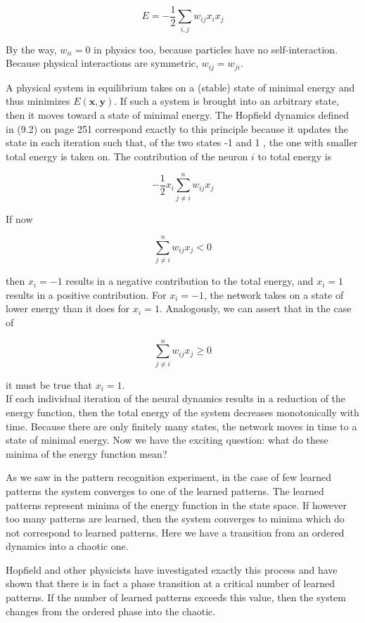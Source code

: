 \documentclass[10pt]{article}
\begin{document}
$$
E=-\frac{1}{2} \sum_{i, j} w_{i j} x_{i} x_{j}
$$

By the way, $w_{i i}=0$ in physics too, because particles have no self-interaction. Because physical interactions are symmetric, $w_{i j}=w_{j i}$.

A physical system in equilibrium takes on a (stable) state of minimal energy and thus minimizes $E(\boldsymbol{x}, \boldsymbol{y})$. If such a system is brought into an arbitrary state, then it moves toward a state of minimal energy. The Hopfield dynamics defined in (9.2) on page 251 correspond exactly to this principle because it updates the state in each iteration such that, of the two states -1 and 1 , the one with smaller total energy is taken on. The contribution of the neuron $i$ to total energy is

$$
-\frac{1}{2} x_{i} \sum_{j \neq i}^{n} w_{i j} x_{j}
$$

If now

$$
\sum_{j \neq i}^{n} w_{i j} x_{j}<0
$$

then $x_{i}=-1$ results in a negative contribution to the total energy, and $x_{i}=1$ results in a positive contribution. For $x_{i}=-1$, the network takes on a state of lower energy than it does for $x_{i}=1$. Analogously, we can assert that in the case of

$$
\sum_{j \neq i}^{n} w_{i j} x_{j} \geq 0
$$

it must be true that $x_{i}=1$.\\
If each individual iteration of the neural dynamics results in a reduction of the energy function, then the total energy of the system decreases monotonically with time. Because there are only finitely many states, the network moves in time to a state of minimal energy. Now we have the exciting question: what do these minima of the energy function mean?

As we saw in the pattern recognition experiment, in the case of few learned patterns the system converges to one of the learned patterns. The learned patterns represent minima of the energy function in the state space. If however too many patterns are learned, then the system converges to minima which do not correspond to learned patterns. Here we have a transition from an ordered dynamics into a chaotic one.

Hopfield and other physicists have investigated exactly this process and have shown that there is in fact a phase transition at a critical number of learned patterns. If the number of learned patterns exceeds this value, then the system changes from the ordered phase into the chaotic.
\end{document}
